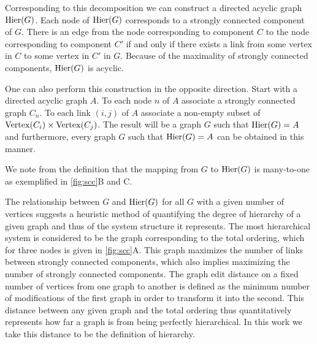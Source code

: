 Corresponding to this decomposition we can construct a directed acyclic graph $\mathrm{Hier} (G)$.  Each node of $\mathrm{Hier} (G)$ corresponds to a strongly connected component of $G$. There is an edge from the node corresponding to component $C$ to the node corresponding to component $C'$ if and only if there exists a link from some vertex in $C$ to some vertex in $C'$ in $G$.  Because of the maximality of strongly connected components, $\mathrm{Hier} (G)$ is acyclic.

One can also perform this construction in the opposite direction.  Start with a directed acyclic graph $A$.  To each node $n$ of $A$ associate
a strongly connected graph $C_n$.  To each link $(i,j)$ of $A$ associate a non-empty subset of $\mathrm{Vertex}(C_i) \times \mathrm{Vertex}(C_j)$.  The result will be a graph $G$ such that $\mathrm{Hier}(G) = A$ and furthermore, every graph $G$ such that $\mathrm{Hier}(G) = A$ can be obtained in this manner.

We note from the definition that the mapping from $G$ to $\mathrm{Hier}(G)$ is many-to-one as exemplified in \ref{fig:scc}B and C.

The relationship between $G$ and $\mathrm{Hier}(G)$ for all $G$ with a given number of vertices suggests a heuristic method of quantifying the degree of hierarchy of a given graph and thus of the system structure it represents. The most hierarchical system is considered to be the graph corresponding to the total ordering, which for three nodes is given in \ref{fig:scc}A. This graph maximizes the number of links between strongly connected components, which also implies maximizing the number of strongly connected components. The graph edit distance on a fixed number of vertices from one graph to another is defined as the minimum number of modifications of the first graph in order to transform it into the second. This distance between any given graph and the total ordering thus quantitatively represents how far a graph is from being perfectly hierarchical. In this work we take this distance to be the definition of hierarchy.


